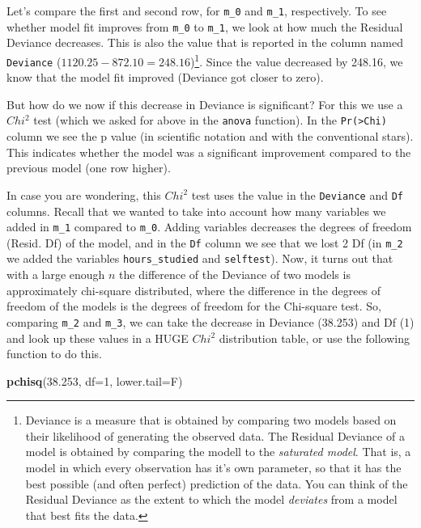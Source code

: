 \documentclass[
]{article}
\newenvironment{Shaded}{\begin{snugshade}}{\end{snugshade}}
\newcommand{\DataTypeTok}[1]{\textcolor[rgb]{0.13,0.29,0.53}{#1}}
\newcommand{\DecValTok}[1]{\textcolor[rgb]{0.00,0.00,0.81}{#1}}
\newcommand{\FloatTok}[1]{\textcolor[rgb]{0.00,0.00,0.81}{#1}}
\newcommand{\KeywordTok}[1]{\textcolor[rgb]{0.13,0.29,0.53}{\textbf{#1}}}
\newcommand{\NormalTok}[1]{#1}
\begin{document}
Let's compare the first and second row, for \texttt{m\_0} and
\texttt{m\_1}, respectively. To see whether model fit improves from
\texttt{m\_0} to \texttt{m\_1}, we look at how much the Residual
Deviance decreases. This is also the value that is reported in the
column named \texttt{Deviance} (\(1120.25 - 872.10 = 248.16\))\footnote{Deviance
  is a measure that is obtained by comparing two models based on their
  likelihood of generating the observed data. The Residual Deviance of a
  model is obtained by comparing the modell to the \emph{saturated
  model}. That is, a model in which every observation has it's own
  parameter, so that it has the best possible (and often perfect)
  prediction of the data. You can think of the Residual Deviance as the
  extent to which the model \emph{deviates} from a model that best fits
  the data.}. Since the value decreased by 248.16, we know that the
model fit improved (Deviance got closer to zero).

But how do we now if this decrease in Deviance is significant? For this
we use a \(Chi^2\) test (which we asked for above in the \texttt{anova}
function). In the \texttt{Pr(\textgreater{}Chi)} column we see the p
value (in scientific notation and with the conventional stars). This
indicates whether the model was a significant improvement compared to
the previous model (one row higher).

In case you are wondering, this \(Chi^2\) test uses the value in the
\texttt{Deviance} and \texttt{Df} columns. Recall that we wanted to take
into account how many variables we added in \texttt{m\_1} compared to
\texttt{m\_0}. Adding variables decreases the degrees of freedom (Resid.
Df) of the model, and in the \texttt{Df} column we see that we lost 2 Df
(in \texttt{m\_2} we added the variables \texttt{hours\_studied} and
\texttt{selftest}). Now, it turns out that with a large enough \(n\) the
difference of the Deviance of two models is approximately chi-square
distributed, where the difference in the degrees of freedom of the
models is the degrees of freedom for the Chi-square test. So, comparing
\texttt{m\_2} and \texttt{m\_3}, we can take the decrease in Deviance
(38.253) and Df (1) and look up these values in a HUGE \(Chi^2\)
distribution table, or use the following function to do this.

\begin{Shaded}
\begin{Highlighting}[]
\KeywordTok{pchisq}\NormalTok{(}\FloatTok{38.253}\NormalTok{, }\DataTypeTok{df=}\DecValTok{1}\NormalTok{, }\DataTypeTok{lower.tail=}\NormalTok{F)}
\end{Highlighting}
\end{Shaded}
\end{document}
